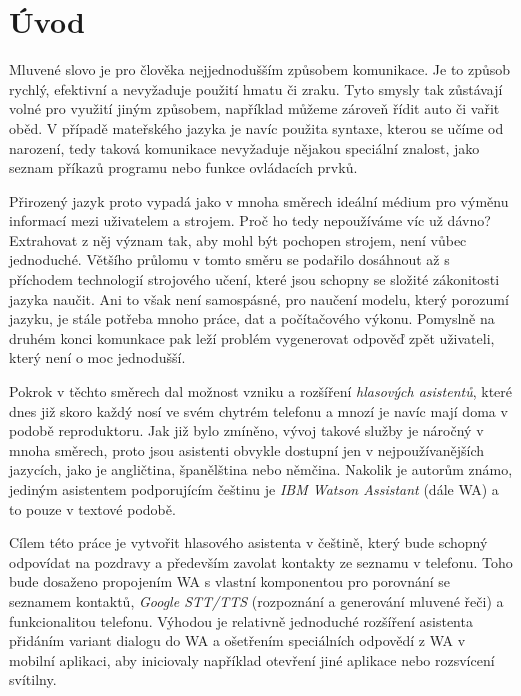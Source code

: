 \chapter*{Úvod}

Mluvené slovo je pro člověka nejjednodušším způsobem komunikace. Je to
způsob rychlý, efektivní a nevyžaduje použití hmatu či zraku. Tyto smysly
tak zůstávají volné pro využití jiným způsobem, například můžeme zároveň
řídit auto či vařit oběd. V případě mateřského jazyka je navíc použita
syntaxe, kterou se učíme od narození, tedy taková komunikace nevyžaduje
nějakou speciální znalost, jako seznam příkazů programu nebo funkce
ovládacích prvků.

Přirozený jazyk proto vypadá jako v mnoha směrech ideální médium pro výměnu
informací mezi uživatelem a strojem. Proč ho tedy nepoužíváme víc už dávno?
Extrahovat z něj význam tak, aby mohl být pochopen strojem, není vůbec
jednoduché. Většího průlomu v tomto směru se podařilo dosáhnout až s příchodem
technologií strojového učení, které jsou schopny se složité zákonitosti
jazyka  naučit. Ani to však není samospásné, pro naučení modelu,
který porozumí jazyku, je stále potřeba mnoho práce, dat a počítačového
výkonu. Pomyslně na druhém konci komunkace pak leží problém vygenerovat
odpověď zpět uživateli, který není o moc jednodušší.

Pokrok v těchto směrech dal možnost vzniku a rozšíření
\textit{hlasových asistentů}, které dnes již skoro každý nosí ve svém
chytrém telefonu a mnozí je navíc mají doma v podobě 
reproduktoru. Jak již bylo zmíněno, vývoj takové služby je náročný v mnoha
směrech, proto jsou asistenti obvykle dostupní jen v nejpoužívanějších
jazycích, jako je angličtina, španělština nebo němčina. Nakolik je autorům
známo, jediným asistentem podporujícím češtinu je \textit{IBM Watson Assistant}
(dále WA) a to pouze v textové podobě.

Cílem této práce je vytvořit hlasového asistenta v češtině, který bude schopný
odpovídat na pozdravy a především zavolat kontakty ze seznamu v telefonu.
Toho bude dosaženo propojením WA s vlastní komponentou
pro porovnání se seznamem kontaktů, \textit{Google STT/TTS}
(rozpoznání a generování mluvené řeči) a funkcionalitou telefonu. Výhodou
je relativně jednoduché rozšíření asistenta přidáním variant dialogu do WA
a ošetřením speciálních odpovědí z WA v mobilní aplikaci, aby iniciovaly
například otevření jiné aplikace nebo rozsvícení svítilny.